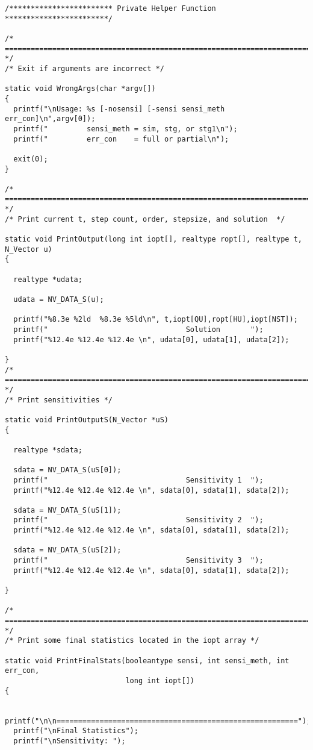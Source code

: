 \begin{verbatim}
/************************ Private Helper Function ************************/

/* ======================================================================= */
/* Exit if arguments are incorrect */

static void WrongArgs(char *argv[])
{
  printf("\nUsage: %s [-nosensi] [-sensi sensi_meth err_con]\n",argv[0]);
  printf("         sensi_meth = sim, stg, or stg1\n");
  printf("         err_con    = full or partial\n");
  
  exit(0);
}

/* ======================================================================= */
/* Print current t, step count, order, stepsize, and solution  */

static void PrintOutput(long int iopt[], realtype ropt[], realtype t, N_Vector u)
{

  realtype *udata;
  
  udata = NV_DATA_S(u);

  printf("%8.3e %2ld  %8.3e %5ld\n", t,iopt[QU],ropt[HU],iopt[NST]);
  printf("                                Solution       ");
  printf("%12.4e %12.4e %12.4e \n", udata[0], udata[1], udata[2]);
  
}
/* ======================================================================= */
/* Print sensitivities */

static void PrintOutputS(N_Vector *uS)
{

  realtype *sdata;

  sdata = NV_DATA_S(uS[0]);
  printf("                                Sensitivity 1  ");
  printf("%12.4e %12.4e %12.4e \n", sdata[0], sdata[1], sdata[2]);
  
  sdata = NV_DATA_S(uS[1]);
  printf("                                Sensitivity 2  ");
  printf("%12.4e %12.4e %12.4e \n", sdata[0], sdata[1], sdata[2]);

  sdata = NV_DATA_S(uS[2]);
  printf("                                Sensitivity 3  ");
  printf("%12.4e %12.4e %12.4e \n", sdata[0], sdata[1], sdata[2]);

}

/* ======================================================================= */
/* Print some final statistics located in the iopt array */

static void PrintFinalStats(booleantype sensi, int sensi_meth, int err_con, 
                            long int iopt[])
{

  printf("\n\n========================================================");
  printf("\nFinal Statistics");
  printf("\nSensitivity: ");


\end{verbatim}
